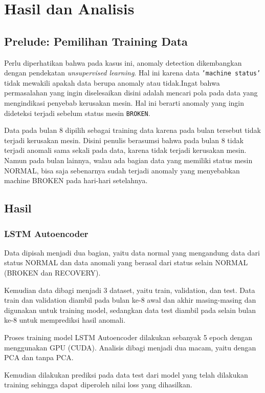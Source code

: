 \chapter{Hasil dan Analisis} 

\section{Prelude: Pemilihan Training Data}

Perlu diperhatikan bahwa pada kasus ini, anomaly detection dikembangkan dengan pendekatan \emph{unsupervised learning}. Hal ini karena data \texttt{'machine status'} tidak mewakili apakah data berupa anomaly atau tidak.Ingat bahwa permasalahan yang ingin diselesaikan disini adalah mencari pola pada data yang mengindikasi penyebab kerusakan mesin. Hal ini berarti anomaly yang ingin dideteksi terjadi sebelum status mesin \texttt{BROKEN}. 

Data pada bulan 8 dipilih sebagai training data karena pada bulan tersebut tidak terjadi kerusakan mesin. Disini penulis berasumsi bahwa pada bulan 8 tidak terjadi anomali sama sekali pada data, karena tidak terjadi kerusakan mesin. Namun pada bulan lainnya, walau ada bagian data yang memiliki status mesin NORMAL, bisa saja sebenarnya sudah terjadi anomaly yang menyebabkan machine BROKEN pada hari-hari setelahnya.

\section{Hasil}
\subsection{LSTM Autoencoder}

Data dipisah menjadi dua bagian, yaitu data normal yang mengandung data dari status NORMAL dan data anomali yang berasal dari status selain NORMAL (BROKEN dan RECOVERY).

Kemudian data dibagi menjadi 3 dataset, yaitu train, validation, dan test. Data train dan validation diambil pada bulan ke-8 awal dan akhir masing-masing dan digunakan untuk training model, sedangkan data test diambil pada selain bulan ke-8 untuk memprediksi hasil anomali.

Proses training model LSTM Autoencoder dilakukan sebanyak 5 epoch dengan menggunakan GPU (CUDA). Analisis dibagi menjadi dua macam, yaitu dengan PCA dan tanpa PCA.

Kemudian dilakukan prediksi pada data test dari model yang telah dilakukan training sehingga dapat diperoleh nilai loss yang dihasilkan.

